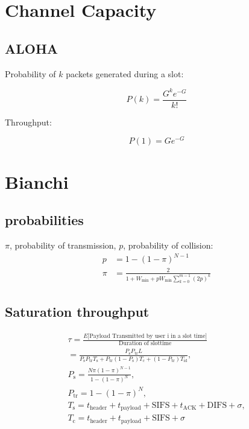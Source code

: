 \documentclass[11pt, a4paper,twocolumn]{scrartcl}
\begin{document}
\section{Channel Capacity}

\subsection{ALOHA}
Probability of $k$ packets generated during a slot:

\begin{equation}
P(k) = \frac{G^ke^{-G}}{k!}
\end{equation}

Throughput:

\begin{equation}
P(1) = Ge^{-G}
\end{equation}

\section{Bianchi}

\subsection{probabilities}
$\pi$, probability of transmission, $p$, probability of collision:
\begin{align}
p &= 1-(1-\pi)^{N-1} \\
\pi &= \frac{2}{ 1 + W_\textrm{min} + pW_\textrm{min}\sum^{m-1}_{k=0}(2p)^k}
\end{align}

\subsection{Saturation throughput}

\begin{align}
 \tau = \frac{E\lbrack\textrm{Payload Transmitted by user i in a slot time}\rbrack}{\textrm{Duration of slottime}} \\ 
 = \frac{P_\textrm{s}P_{\textrm{tr}}L}{P_\textrm{s}P_{\textrm{tr}}T_{\textrm{s}} + P_\textrm{tr}(1-P_\textrm{s})T_\textrm{c} + (1-P_\textrm{tr})T_\textrm{id}}, \\
 P_\textrm{s} = \frac{N\pi (1-\pi)^{N-1}}{1-(1-\pi)^N}, \\
 P_\textrm{tr} = 1-(1-\pi)^N, \\
 T_\textrm{s} = t_\textrm{header} + t_\textrm{payload} + \textrm{SIFS} + t_\textrm{ACK} + \textrm{DIFS} + \sigma,\\
 T_\textrm{c} = t_\textrm{header} + t_\textrm{payload} + \textrm{SIFS} + \sigma
\end{align}
\end{document}

